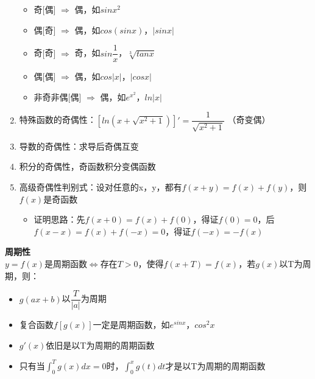 \documentclass{ctexart}
\begin{document}
\begin{theorem}[函数的四种特性]
\begin{enumerate}
\begin{itemize}
                        \item 奇$[$偶$]$ $\Rightarrow$ 偶，如$sinx^2$
                        \item 偶$[$奇$]$ $\Rightarrow$ 偶，如$cos(sinx)$，$|sinx|$
                        \item 奇$[$奇$]$ $\Rightarrow$ 奇，如$sin\dfrac{1}{x}$，$\sqrt[3]{tanx}$
                        \item 偶$[$偶$]$ $\Rightarrow$ 偶，如$cos|x|$，$|cosx|$
                        \item 非奇非偶$[$偶$]$ $\Rightarrow$ 偶，如$e^{x^2}$，$ln|x|$
                    \end{itemize}
                \item 特殊函数的奇偶性：$[ln(x+\sqrt{x^2+1})]'=\dfrac{1}{\sqrt{x^2+1}}$ （奇变偶）
                \item 导数的奇偶性：求导后奇偶互变
                \item 积分的奇偶性，奇函数积分变偶函数
                \item 高级奇偶性判别式：设对任意的x，y，都有$f(x+y)=f(x)+f(y)$，则$f(x)$是奇函数
                    \begin{itemize}
                        \item 证明思路：先$f(x+0)=f(x)+f(0)$，得证$f(0)=0$，后$f(x-x)=f(x)+f(-x)=0$，得证$f(-x)=-f(x)$
                    \end{itemize}
            \end{enumerate}
        \textbf{周期性}\\
        $y=f(x)$是周期函数$\Leftrightarrow$存在$T>0$，使得$f(x+T)=f(x)$，若$g(x)$以T为周期，则：
            \begin{itemize}
                \item $g(ax+b)$以$\dfrac{T}{|a|}$为周期
                \item 复合函数$f[g(x)]$一定是周期函数，如$e^{sinx}$，$cos^2x$
                \item $g'(x)$依旧是以T为周期的周期函数
                \item 只有当$\int_{0}^{T}g(x)dx=0$时，$\int_{0}^{x}g(t)dt$才是以T为周期的周期函数
            \end{itemize}
\end{theorem}
\end{document}
